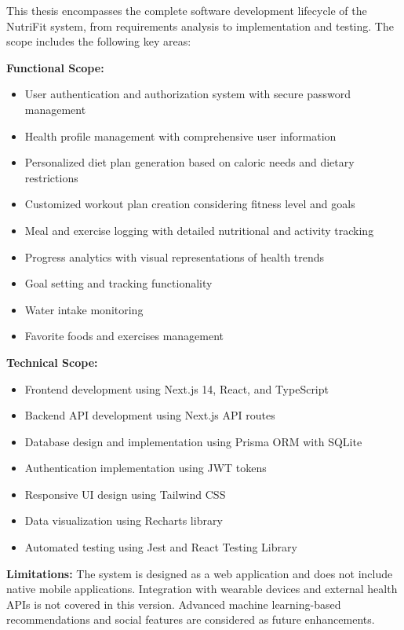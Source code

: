 This thesis encompasses the complete software development lifecycle of the NutriFit system, from requirements analysis to implementation and testing. The scope includes the following key areas:

\textbf{Functional Scope:}
\begin{itemize}
    \item User authentication and authorization system with secure password management
    \item Health profile management with comprehensive user information
    \item Personalized diet plan generation based on caloric needs and dietary restrictions
    \item Customized workout plan creation considering fitness level and goals
    \item Meal and exercise logging with detailed nutritional and activity tracking
    \item Progress analytics with visual representations of health trends
    \item Goal setting and tracking functionality
    \item Water intake monitoring
    \item Favorite foods and exercises management
\end{itemize}

\textbf{Technical Scope:}
\begin{itemize}
    \item Frontend development using Next.js 14, React, and TypeScript
    \item Backend API development using Next.js API routes
    \item Database design and implementation using Prisma ORM with SQLite
    \item Authentication implementation using JWT tokens
    \item Responsive UI design using Tailwind CSS
    \item Data visualization using Recharts library
    \item Automated testing using Jest and React Testing Library
\end{itemize}

\textbf{Limitations:}
The system is designed as a web application and does not include native mobile applications. Integration with wearable devices and external health APIs is not covered in this version. Advanced machine learning-based recommendations and social features are considered as future enhancements.

